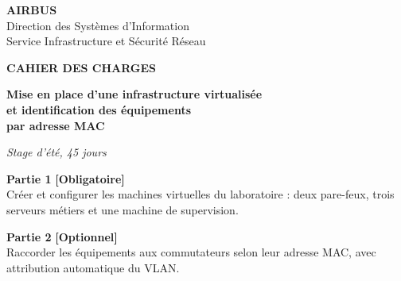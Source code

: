 \documentclass[11pt,a4paper]{article}
\newcommand{\oblig}{\textcolor{okgreen}{\small\textbf{[Obligatoire]}}}
\newcommand{\opt}{\textcolor{warn}{\small\textbf{[Optionnel]}}}
\begin{document}
\begin{titlepage}
\thispagestyle{empty}

\begin{center}
\vspace*{0.4cm}
{\sffamily\Large\bfseries\color{primary} AIRBUS}\\[3pt]
{\sffamily\small\color{gris} Direction des Systèmes d'Information}\\[1pt]
{\sffamily\small\color{gris} Service Infrastructure et Sécurité Réseau}

\vspace{2.0cm}

{\sffamily\Large\bfseries\color{gris} CAHIER DES CHARGES}

\vspace{0.9cm}

{\sffamily\LARGE\bfseries\color{primary}
Mise en place d'une infrastructure virtualisée\\[8pt]
et identification des équipements\\[8pt]
par adresse MAC}

\vspace{0.5cm}
{\normalsize\itshape\color{gris} Stage d'été, 45 jours}
\end{center}

\vspace{1.1cm}

\begin{tcolorbox}[enhanced,colback=soft,colframe=primary,boxrule=0.8pt,arc=2pt,
  left=10pt,right=10pt,top=8pt,bottom=8pt,
  fonttitle=\bfseries\sffamily\small,title={Un projet en deux parties},coltitle=white]
\setlength{\parskip}{5pt}
\noindent\textbf{\color{primary}Partie 1} \hfill \oblig\\[1pt]
Créer et configurer les machines virtuelles du laboratoire : deux pare-feux, trois serveurs
métiers et une machine de supervision.

\noindent\textbf{\color{primary}Partie 2} \hfill \opt\\[1pt]
Raccorder les équipements aux commutateurs selon leur adresse MAC, avec attribution
automatique du VLAN.


\end{tcolorbox}
\end{titlepage}
\end{document}
